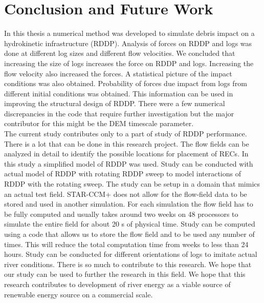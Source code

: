\section{Conclusion and Future Work}
In this thesis a numerical method was developed to simulate debris impact on a hydrokinetic infrastructure (RDDP). Analysis of forces on RDDP and logs was done at different log sizes and different flow velocities. We concluded that increasing the size of logs increases the force on RDDP and logs. Increasing the flow velocity also increased the forces. A statistical picture of the impact conditions was also obtained. Probability of forces due impact from logs from different initial conditions was obtained. This information can be used in improving the structural design of RDDP. There were a few numerical discrepancies in the code that require further investigation but the major contributor for this might be the DEM timescale parameter.\\
The current study contributes only to a part of study of RDDP performance. There is a lot that can be done in this research project. The flow fields can be analyzed in detail to identify the possible locations for placement of RECs. In this study a simplified model of RDDP was used. Study can be conducted with actual model of RDDP with rotating RDDP sweep to model interactions of RDDP with the rotating sweep. The study can be setup in a domain that mimics an actual test field. STAR-CCM+ does not allow for the flow-field data to be stored and used in another simulation. For each simulation the flow field has to be fully computed and usually takes around two weeks on 48 processors to simulate the entire field for about 20 s of physical time. Study can be computed using a code that allows us to store the flow field and to be used any number of times. This will reduce the total computation time from weeks to less than 24 hours. Study can be conducted for different orientations of logs to imitate actual river conditions. There is so much to contribute to this research. We hope that our study can be used to further the research in this field. We hope that this research contributes to development of river energy as a viable source of renewable energy source on a commercial scale. 